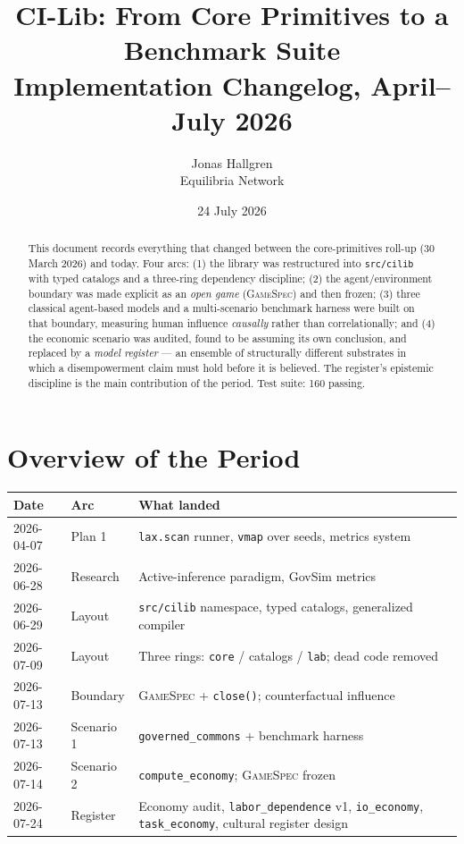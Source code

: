 \documentclass[11pt]{article}
\title{CI-Lib: From Core Primitives to a Benchmark Suite\\
\large Implementation Changelog, April--July 2026}
\author{Jonas Hallgren\\Equilibria Network}
\date{24 July 2026}
\begin{document}
\maketitle

\begin{abstract}
This document records everything that changed between the core-primitives roll-up
(30 March 2026) and today. Four arcs: (1) the library was restructured into
\texttt{src/cilib} with typed catalogs and a three-ring dependency discipline;
(2) the agent/environment boundary was made explicit as an \emph{open game}
(\textsc{GameSpec}) and then frozen; (3) three classical agent-based models and a
multi-scenario benchmark harness were built on that boundary, measuring human
influence \emph{causally} rather than correlationally; and (4) the economic scenario
was audited, found to be assuming its own conclusion, and replaced by a
\emph{model register} --- an ensemble of structurally different substrates in which a
disempowerment claim must hold before it is believed. The register's epistemic
discipline is the main contribution of the period. Test suite: 160 passing.
\end{abstract}

\tableofcontents
\newpage

\section{Overview of the Period}

\begin{center}
\begin{tabular}{@{}llp{7.4cm}@{}}
\toprule
\textbf{Date} & \textbf{Arc} & \textbf{What landed} \\
\midrule
2026-04-07 & Plan 1 & \texttt{lax.scan} runner, \texttt{vmap} over seeds, metrics system \\
2026-06-28 & Research & Active-inference paradigm, GovSim metrics \\
2026-06-29 & Layout & \texttt{src/cilib} namespace, typed catalogs, generalized compiler \\
2026-07-09 & Layout & Three rings: \texttt{core} / catalogs / \texttt{lab}; dead code removed \\
2026-07-13 & Boundary & \textsc{GameSpec} + \texttt{close()}; counterfactual influence \\
2026-07-13 & Scenario 1 & \texttt{governed\_commons} + benchmark harness \\
2026-07-14 & Scenario 2 & \texttt{compute\_economy}; \textsc{GameSpec} frozen \\
2026-07-24 & Register & Economy audit, \texttt{labor\_dependence} v1, \texttt{io\_economy},
                         \texttt{task\_economy}, cultural register design \\
\bottomrule
\end{tabular}
\end{center}
\end{document}

